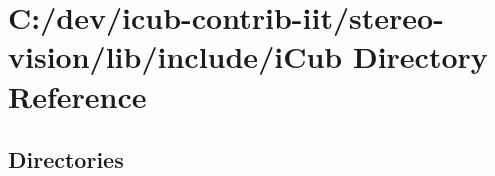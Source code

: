\section{C\+:/dev/icub-\/contrib-\/iit/stereo-\/vision/lib/include/i\+Cub Directory Reference}
\label{dir_05906369c2d654c318c8e5f0b9121080}
\subsection*{Directories}
\begin{DoxyCompactItemize}
\end{DoxyCompactItemize}
